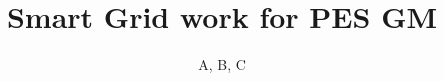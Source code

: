 \documentclass[conference]{IEEEtran}
\begin{document}
%

\title{Smart Grid work for PES GM}



\author{A, B, C}




\end{document}
